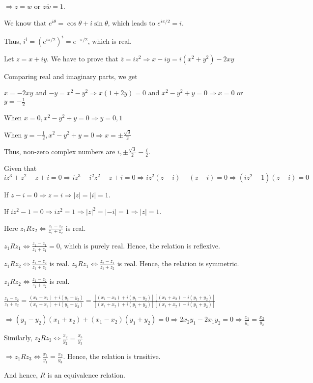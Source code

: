   $\Rightarrow z = w$ or $z\overline{w} = 1$.
\item We know that $e^{i\theta} = \cos\theta + i\sin\theta$, which leads to $e^{i\pi/2} = i$.

  Thus, $i^i = \left(e^{i\pi/2}\right)^i = e^{-\pi/2}$, which is real.
\item Let $z = x + iy$. We have to prove that $\overline{z} = iz^2 \Rightarrow x - iy = i(x^2 + y^2) -2xy$

  Comparing real and imaginary parts, we get

  $x = -2xy$ and $-y = x^2 - y^2\Rightarrow x(1 + 2y) = 0$ and $x^2 - y^2 + y = 0\Rightarrow x = 0$ or $y =
  -\frac{1}{2}$

  When $x = 0, x^2 - y^2 + y = 0 \Rightarrow y = 0, 1$

  When $y = -\frac{1}{2}, x^2 - y^2 + y = 0 \Rightarrow x = \pm\frac{\sqrt{3}}{2}$

  Thus, non-zero complex numbers are $i, \pm\frac{\sqrt{3}}{2} - \frac{i}{2}$.
\item Given that $iz^3 + z^2 - z + i = 0 \Rightarrow iz^3 - i^2z^2 - z + i = 0\Rightarrow iz^2(z - i) - (z -
  i) = 0 \Rightarrow (iz^2 - 1)(z - i) = 0$

  If $z - i = 0 \Rightarrow z = i \Rightarrow |z| = |i| = 1$.

  If $iz^2 - 1 = 0 \Rightarrow iz^2 = 1\Rightarrow |z|^2 = |-i| = 1\Rightarrow |z| = 1$.
\item Here $z_1Rz_2\Leftrightarrow \frac{z_1 - z_2}{z_1 + z_2}$ is real.

  $z_1Rz_1\Leftrightarrow \frac{z_1 - z_1}{z_1 + z_1} = 0$, which is purely real. Hence, the relation is
  reflexive.

  $z_1Rz_2\Leftrightarrow \frac{z_1 - z_2}{z_1 + z_2}$ is real. $z_2Rz_1\Leftrightarrow \frac{z_2 - z_1}{z_1
    + z_2}$ is real. Hence, the relation is symmetric.

  $z_1Rz_2\Leftrightarrow \frac{z_1 - z_2}{z_1 + z_2}$ is real.

  $\frac{z_1 - z_2}{z_1 + z_2} = \frac{(x_1 - x_2) + i(y_1 - y_2)}{(x_1 + x_2) + i(y_1 + y_2)} = \frac{[(x_1
      - x_2) + i(y_1 - y_2)][(x_1 + x_2) - i(y_1 + y_2)]}{[(x_1 + x_2) + i(y_1 + y_2)][(x_1 + x_2) - i(y_1 +
      y_2)]}$

  $\Rightarrow (y_1 - y_2)(x_1 + x_2) + (x_1 - x_2)(y_1 + y_2) = 0 \Rightarrow 2x_2y_1 - 2x_1y_2 = 0
  \Rightarrow \frac{x_1}{y_1} = \frac{x_2}{y_2}$

  Similarly, $z_2Rz_3 \Leftrightarrow \frac{x_2}{y_2} = \frac{x_3}{y_3}$

  $\Rightarrow z_1Rz_3 \Leftrightarrow \frac{x_1}{y_1} = \frac{x_3}{y_3}$. Hence, the relation is trnsitive.

  And hence, $R$ is an equivalence relation.
\stopitemize
